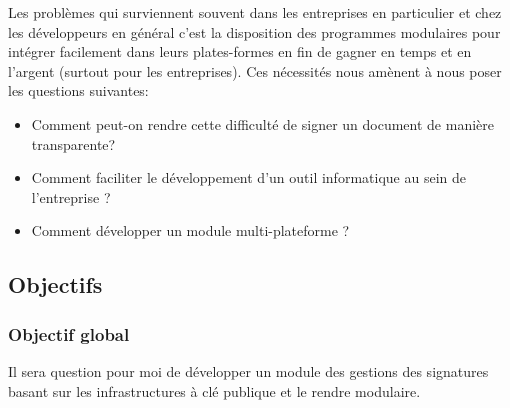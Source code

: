 \documentclass[12pt,a4paper]{article}
\begin{document}
		\newpage
		
		Les problèmes qui surviennent souvent dans les entreprises en particulier et chez les développeurs en général c'est la disposition des programmes modulaires pour intégrer facilement dans leurs plates-formes en fin de gagner en temps et en l'argent (surtout pour les entreprises). Ces nécessités nous amènent à nous poser les questions suivantes:\\
		
	\begin{itemize}
		\item Comment peut-on rendre cette difficulté de signer un document de manière transparente?
		\item Comment faciliter le développement d'un outil informatique au sein de l'entreprise ?
		
		\item Comment développer un module multi-plateforme ?
	\end{itemize}
	
	
	
	\subsection{Objectifs}
		\subsubsection{Objectif global}
			Il sera question pour moi de développer un module des gestions des signatures basant sur les infrastructures à clé publique et le rendre modulaire.
\end{document}
